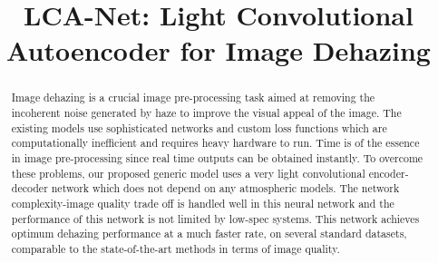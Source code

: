 \documentclass[conference]{IEEEtran}
\begin{document}
\title{LCA-Net: Light Convolutional Autoencoder for Image Dehazing}

\author{
\and
{}
\and
{}
\and
{}


}

\maketitle

\begin{abstract}
Image dehazing is a crucial image pre-processing task aimed at removing the incoherent noise generated by haze to improve the visual appeal of the image. The existing models use sophisticated networks and custom loss functions which are computationally inefficient and requires heavy hardware to run. Time is of the essence in image pre-processing since real time outputs can be obtained instantly. To overcome these problems, our proposed generic model uses a very light convolutional encoder-decoder network which does not depend on any atmospheric models. The network complexity-image quality trade off is handled well in this neural network and the performance of this network is not limited by low-spec systems. This network achieves optimum dehazing performance at a much faster rate, on several standard datasets, comparable to the state-of-the-art methods in terms of image quality.  



\end{abstract}
\end{document}
